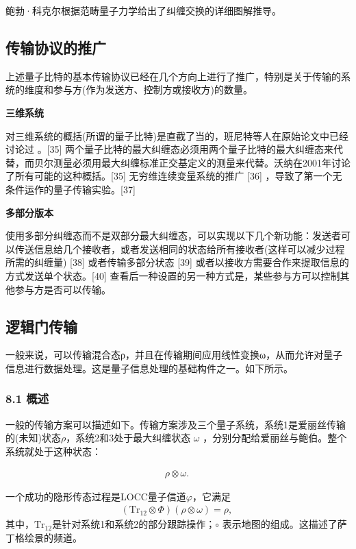鲍勃·科克尔根据范畴量子力学给出了纠缠交换的详细图解推导。

\subsection{传输协议的推广}

上述量子比特的基本传输协议已经在几个方向上进行了推广，特别是关于传输的系统的维度和参与方(作为发送方、控制方或接收方)的数量。

\textbf{三维系统}

对三维系统的概括(所谓的量子比特)是直截了当的，班尼特等人在原始论文中已经讨论过 。[35] 两个量子比特的最大纠缠态必须用两个量子比特的最大纠缠态来代替，而贝尔测量必须用最大纠缠标准正交基定义的测量来代替。沃纳在2001年讨论了所有可能的这种概括。[35] 无穷维连续变量系统的推广 [36] ，导致了第一个无条件运作的量子传输实验。[37]

\textbf{多部分版本}

使用多部分纠缠态而不是双部分最大纠缠态，可以实现以下几个新功能：发送者可以传送信息给几个接收者，或者发送相同的状态给所有接收者(这样可以减少过程所需的纠缠量) [38] 或者传输多部分状态 [39] 或者以接收方需要合作来提取信息的方式发送单个状态。[40] 查看后一种设置的另一种方式是，某些参与方可以控制其他参与方是否可以传输。

\subsection{逻辑门传输}

一般来说，可以传输混合态ρ，并且在传输期间应用线性变换ω，从而允许对量子信息进行数据处理。这是量子信息处理的基础构件之一。如下所示。

\subsubsection{8.1 概述}

一般的传输方案可以描述如下。传输方案涉及三个量子系统，系统1是爱丽丝传输的(未知)状态$\rho$，系统2和3处于最大纠缠状态 $\omega$ ，分别分配给爱丽丝与鲍伯。整个系统就处于这种状态：

\begin{align}
\rho \otimes \omega.~
\end{align}

一个成功的隐形传态过程是LOCC量子信道$\varphi$，它满足
\begin{align}
\left(\mathrm{Tr}_{12} \otimes \Phi \right) (\rho \otimes \omega) = \rho,~
\end{align}
其中，$\mathrm{Tr}_{12}$是针对系统1和系统2的部分跟踪操作；$\circ$ 表示地图的组成。这描述了萨丁格绘景的频道。

